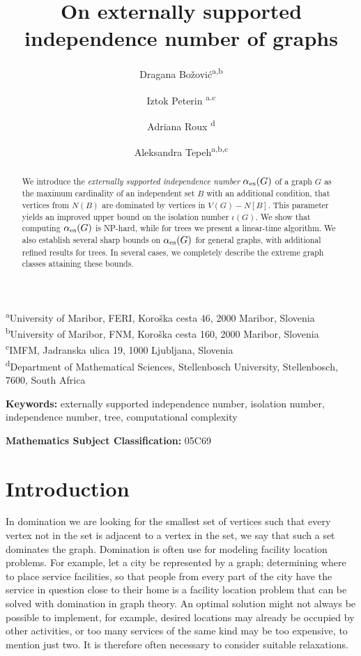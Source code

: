 \documentclass[11pt]{article}
\title{On externally supported independence number of graphs}
\author{
Dragana Bo\v zovi\'{c}\textsuperscript{a,b} \and
Iztok Peterin \textsuperscript{a.c} \and
Adriana Roux \textsuperscript{d} \and 
Aleksandra Tepeh\textsuperscript{a,b,c}
}
\newcommand{\io}{\iota}
\newcommand{\es}{\alpha_{\rm es}}
\begin{document}
\maketitle

\begin{center}
\textsuperscript{a}University of Maribor, FERI, Koroška cesta 46, 2000 Maribor, Slovenia \\
\textsuperscript{b}University of Maribor, FNM, Koroška cesta 160, 2000 Maribor, Slovenia \\
\textsuperscript{c}IMFM, Jadranska ulica 19, 1000 Ljubljana, Slovenia \\
\textsuperscript{d}Department of Mathematical Sciences, Stellenbosch University, Stellenbosch, 7600, South Africa
\end{center}

\begin{abstract}
We introduce the \emph{externally supported independence number} $\es(G)$ of a graph $G$ as the maximum cardinality of an independent set $B$ with an additional condition, that vertices from $N(B)$ are dominated by vertices in $V(G)-N[B]$. This parameter yields an improved upper bound on the isolation number $\io(G)$. We show that computing $\es(G)$ is NP-hard, while for trees we present a linear-time algorithm. We also establish several sharp bounds on  $\es(G)$ for general graphs, with additional refined results for trees. In several cases, we completely describe the extreme graph classes attaining these bounds.   
\end{abstract}

\noindent
{\bf Keywords:} externally supported independence number, isolation number, independence number, tree, computational complexity

\medskip

\noindent
{\bf Mathematics Subject Classification:} 05C69


\section{Introduction} 

In domination we are looking for the smallest set of vertices such that every vertex not in the set is adjacent to a vertex in the set, we say that such a set dominates the graph. Domination is often use for modeling facility location problems. For example, let a city be represented by a graph; determining where to place service facilities, so that people from every part of the city have the service in question close to their home is a facility location problem that can be solved with domination in graph theory. An optimal solution might not always be possible to implement, for example, desired locations may already be occupied by other activities, or too many services of the same kind may be too expensive, to mention just two. It is therefore often necessary to consider suitable relaxations.
\end{document}
